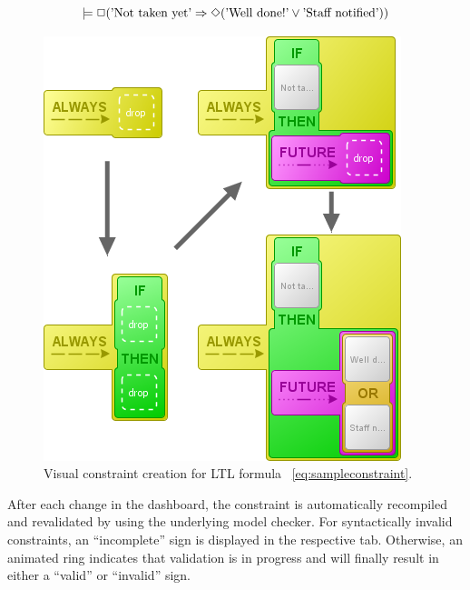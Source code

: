 \documentclass[conference]{IEEEtran}
\begin{document}
\begin{equation} \label{eq:sampleconstraint}
  \models \Box (\textnormal{'Not taken yet'} \Rightarrow \Diamond (\textnormal{'Well done!'} \vee \textnormal{'Staff notified'}))
\end{equation}


\begin{figure}[htbp]
  \centering
  \includegraphics[scale=0.4]{sampleconstraint}
  \caption{Visual constraint creation for LTL formula ~\ref{eq:sampleconstraint}.}
  \label{fig:sampleconstraint}
\end{figure}

After each change in the dashboard, the constraint is automatically recompiled and revalidated by using the underlying model checker. For syntactically invalid constraints, an ``incomplete'' sign is displayed in the respective tab. Otherwise, an animated ring indicates that validation is in progress and will finally result in either a ``valid'' or ``invalid'' sign.
\end{document}
